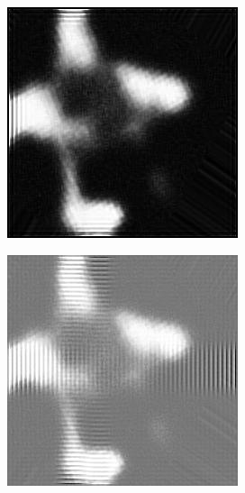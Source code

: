 \begin{figure}[h!]
	\centering
	\begin{minipage}{.5\textwidth}
		\centering
		\includegraphics[width=0.8\linewidth]{inc/img/id_rl}
		\label{fig:id_rl}
	\end{minipage}%
	\begin{minipage}{.5\textwidth}
		\centering
		\includegraphics[width=0.8\linewidth]{inc/img/id_w}
		\label{fig:id_w}
	\end{minipage}
\end{figure}


